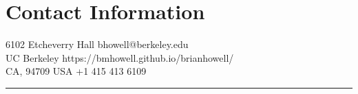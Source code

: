 
\section{\sc Contact Information}
 6102 Etcheverry Hall     \hfill bhowell@berkeley.edu\\
 UC Berkeley  \hfill https://bmhowell.github.io/brianhowell/\\
 CA, 94709 USA \hfill +1 415 413 6109
 
\noindent\rule{\textwidth}{1pt}

